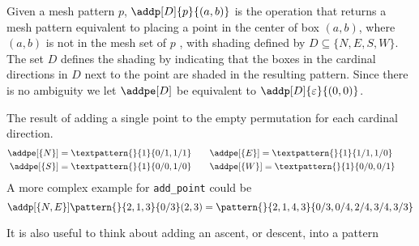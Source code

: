 Given a mesh pattern \(p\), \(\addp[D]{p}{(a,b)}\) is the operation that returns
a mesh pattern equivalent to placing a point in the center of box \((a,b)\),
where \((a,b)\) is not in the mesh set of \(p\) , with shading defined by
\(D\subseteq\{N,E,S,W\}\).
The set \(D\) defines the shading by indicating that the boxes in the cardinal
directions in \(D\) next to the point are shaded in the resulting pattern.
Since there is no ambiguity we let \(\addpe[D]\) be equivalent to \(\addp[D]{\varepsilon}{(0,0)}\).

\begin{example}
    The result of adding a single point to the empty permutation for each cardinal direction.
 \begin{align*}
     \addpe[\{N\}] = \textpattern{}{1}{0/1,1/1} &\qquad\addpe[\{E\}] =\textpattern{}{1}{1/1,1/0} \qquad \\
     \addpe[\{S\}] = \textpattern{}{1}{0/0,1/0} &\qquad\addpe[\{W\}] =\textpattern{}{1}{0/0,0/1} \qquad
\end{align*}
    A more complex example for \texttt{add\_point} could be
\begin{equation*}
\addp[\{N,E\}]{\pattern{}{2,1,3}{0/3}}{(2,3)} = \pattern{}{2,1,4,3}{0/3,0/4,2/4,3/4,3/3}
\end{equation*}
\end{example}

It is also useful to think about adding an ascent, or descent, into a pattern

